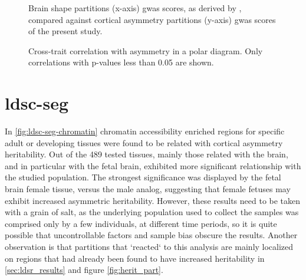 \begin{figure}[H]
\begin{adjustwidth}{-3cm}{-3cm}
	\par\medskip
	\caption[Brain shape genetically related to cortical asymmetry]{Brain shape partitions (x-axis) \ac{gwas} scores, as derived by \citet{Naqvi2021}, compared against cortical asymmetry partitions (y-axis) \ac{gwas} scores of the present study.}
	\label{fig:spearmanShape}
\end{adjustwidth}
\end{figure}


\begin{figure}[H]
	\begin{adjustwidth}{-4cm}{-3cm}
		\centering
		\subfloat{
			
		}
		\subfloat{
			
		}
	\end{adjustwidth}	
	\caption[Cross-trait correlation with cortical asymmetry in a polar diagram]{Cross-trait correlation with asymmetry in a polar diagram. Only correlations with p-values less than 0.05 are shown.}
	\label{fig:cross_trait_polar}
\end{figure}


\section{\acs{ldsc-seg}}
In \autoref{fig:ldsc-seg-chromatin} chromatin accessibility enriched regions for specific adult or developing tissues were found to be related with cortical asymmetry heritability. Out of the 489 tested tissues, mainly those related with the brain, and in particular with the fetal brain, exhibited more significant relationship with the studied population. The strongest significance was displayed by the fetal brain female tissue, versus the male analog, suggesting that female fetuses may exhibit increased asymmetric heritability. However, these results need to be taken with a grain of salt, as the underlying population used to collect the samples was comprised only by a few individuals, at different time periods, so it is quite possible that uncontrollable factors and sample bias obscure the results. Another observation is that partitions that `reacted` to this analysis are mainly localized on regions that had already been found to have increased heritability in \autoref{sec:ldsr_results} and figure \autoref{fig:herit_part}.


